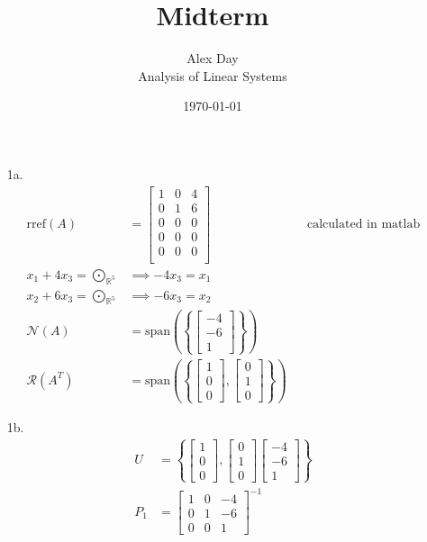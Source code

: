\documentclass[12pt,fleqn,leqno,letterpaper]{article}
\title{Midterm}
\author{Alex Day\\
	\small{Analysis of Linear Systems}
}
\date{\today}
\begin{document}
\maketitle
	\begin{enumerate}
		\item[1a.]
			\begin{align*}
			  \text{rref}(A) &= \begin{bmatrix}
								1  &  0  &  4\\
								0  &  1  &  6\\
								0  &  0  &  0\\
								0  &  0  &  0\\
								0  &  0  &  0\\
								\end{bmatrix}&&\text{calculated in matlab}\\
			  x_{1} + 4x_{3} = \bigodot_{\mathbb{R}^{5}} &\implies -4x_{3} = x_{1}\\
			  x_{2} + 6x_{3} = \bigodot_{\mathbb{R}^{5}} &\implies -6x_{3} = x_{2}\\
			  \mathcal{N}(A) &= \text{span}\left(\left\{
							    \begin{bmatrix} -4 \\ -6 \\ 1 \end{bmatrix}
								\right\}\right)\\
			  \mathcal{R}(A^{T}) &= \text{span}\left(\left\{
							    \begin{bmatrix} 1 \\ 0 \\ 0  \end{bmatrix},
							    \begin{bmatrix} 0 \\ 1 \\ 0  \end{bmatrix}
								\right\}\right)
			\end{align*}
	  \item[1b.]
			\begin{align*}
			  U &= \left\{
					\begin{bmatrix} 1 \\ 0 \\ 0  \end{bmatrix},
					\begin{bmatrix} 0 \\ 1 \\ 0  \end{bmatrix}
					\begin{bmatrix} -4 \\ -6 \\ 1 \end{bmatrix}
					\right\}\\
			  P_{1} &=
					\begin{bmatrix} 1 & 0 & -4 \\ 0 & 1 & -6 \\ 0 & 0 & 1 \end{bmatrix}^{-1}
			\end{align*}

	\end{enumerate}
\end{document}

